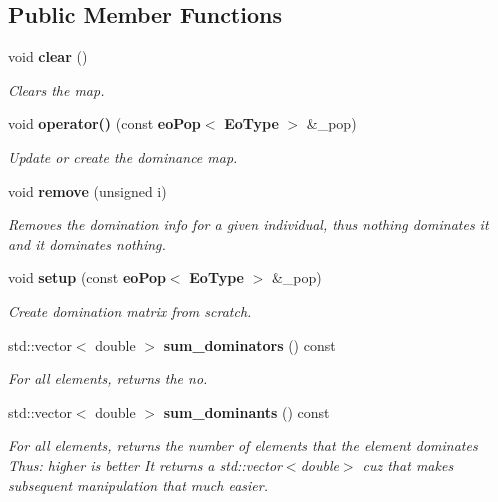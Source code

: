 \subsection*{Public Member Functions}
\begin{CompactItemize}
\item 
void {\bf clear} ()\label{classeo_dominance_map_a0}

\begin{CompactList}\small\item\em Clears the map. \item\end{CompactList}\item 
void {\bf operator()} (const {\bf eo\-Pop}$<$ {\bf Eo\-Type} $>$ \&\_\-pop)\label{classeo_dominance_map_a1}

\begin{CompactList}\small\item\em Update or create the dominance map. \item\end{CompactList}\item 
void {\bf remove} (unsigned i)\label{classeo_dominance_map_a2}

\begin{CompactList}\small\item\em Removes the domination info for a given individual, thus nothing dominates it and it dominates nothing. \item\end{CompactList}\item 
void {\bf setup} (const {\bf eo\-Pop}$<$ {\bf Eo\-Type} $>$ \&\_\-pop)
\begin{CompactList}\small\item\em Create domination matrix from scratch. \item\end{CompactList}\item 
std::vector$<$ double $>$ {\bf sum\_\-dominators} () const 
\begin{CompactList}\small\item\em For all elements, returns the no. \item\end{CompactList}\item 
std::vector$<$ double $>$ {\bf sum\_\-dominants} () const \label{classeo_dominance_map_a5}

\begin{CompactList}\small\item\em For all elements, returns the number of elements that the element dominates Thus: higher is better It returns a std::vector$<$double$>$ cuz that makes subsequent manipulation that much easier. \item\end{CompactList}\end{CompactItemize}
